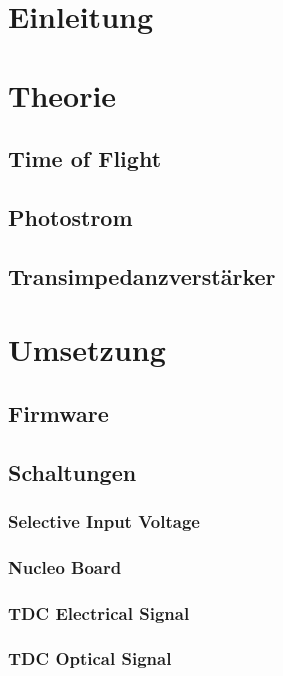 \documentclass[11pt,a4paper,hidelinks]{article}
\begin{document}










\section{Einleitung}

\section{Theorie}

\subsection{Time of Flight}
\subsection{Photostrom}
\subsection{Transimpedanzverstärker}

\section{Umsetzung}

\subsection{Firmware}
\subsection{Schaltungen}

\subsubsection{Selective Input Voltage}
\subsubsection{Nucleo Board}
\subsubsection{TDC Electrical Signal}
\subsubsection{TDC Optical Signal}
\end{document}
